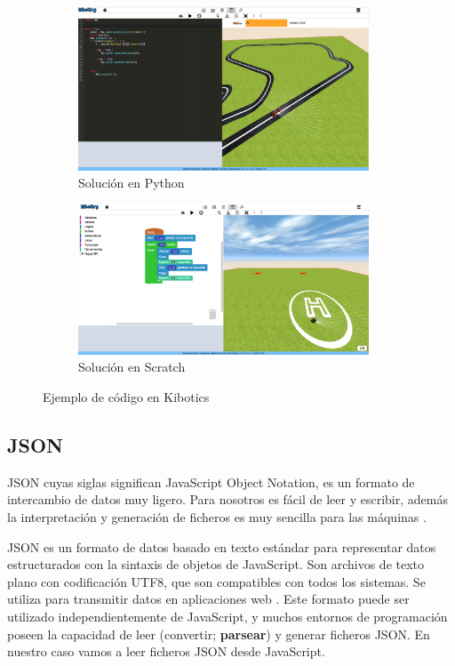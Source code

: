 \begin{figure}[H]
  \begin{subfigure}[b]{1\textwidth}
  \centering
    \includegraphics[width=0.95\textwidth, height=0.4\textwidth]{chapters/images/python.png}
    \caption{Solución en Python}
    \label{fig:f1}
  \end{subfigure}
  \hfill
  \begin{subfigure}[b]{1\textwidth}
  \centering
    \includegraphics[width=0.95\textwidth, height=0.4\textwidth]{chapters/images/scratch2.png}
    \caption{Solución en Scratch}
    \label{fig:f2}
  \end{subfigure}
  \caption{Ejemplo de código en Kibotics }
\end{figure}


\subsection{JSON} JSON cuyas siglas significan JavaScript Object Notation, es un formato de intercambio de datos muy ligero. Para nosotros es fácil de leer y escribir, además la interpretación y generación de ficheros es muy sencilla para las máquinas \cite{json}.

JSON es un formato de datos basado en texto estándar para representar datos estructurados con la sintaxis de objetos de JavaScript. Son archivos de texto plano con codificación UTF8, que son compatibles con todos los sistemas. Se utiliza para transmitir datos en aplicaciones web \cite{json2}. 
Este formato puede ser utilizado independientemente de JavaScript, y muchos entornos de programación poseen la capacidad de leer (convertir; \textbf{parsear}) y generar ficheros JSON. En nuestro caso vamos a leer ficheros JSON desde JavaScript.

